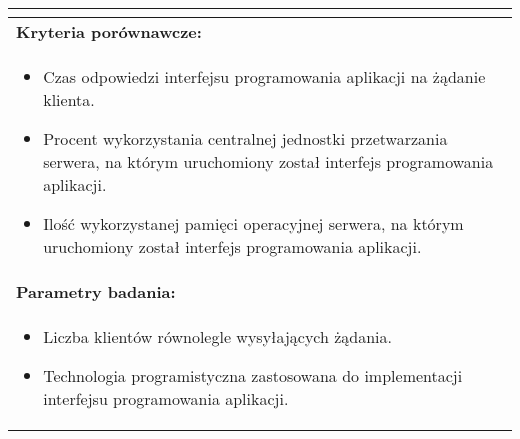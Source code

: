 \begin{longtable}[c]{|llll|}
{\begin{itemize}[label={}]
          \end{itemize}
    }                                                           \\ \hline
    \multicolumn{4}{|l|}{\textbf{Kryteria porównawcze:}}                             \\ \hline
    \multicolumn{4}{|p{\linewidth}|}{
        \begin{itemize}
            \item Czas odpowiedzi interfejsu programowania aplikacji na żądanie klienta.
            \item Procent wykorzystania centralnej jednostki przetwarzania serwera, na którym uruchomiony został interfejs programowania aplikacji.
            \item Ilość wykorzystanej pamięci operacyjnej serwera, na którym uruchomiony został interfejs programowania aplikacji.
        \end{itemize}
    }                                                           \\ \hline
    \multicolumn{4}{|l|}{\textbf{Parametry badania:}}                                \\ \hline
    \multicolumn{4}{|p{\linewidth}|}{
        \begin{itemize}
            \item Liczba klientów równolegle wysyłających żądania.
            \item Technologia programistyczna zastosowana do implementacji interfejsu programowania aplikacji.
        \end{itemize}
    }                                                           \\ \hline
\end{longtable}


